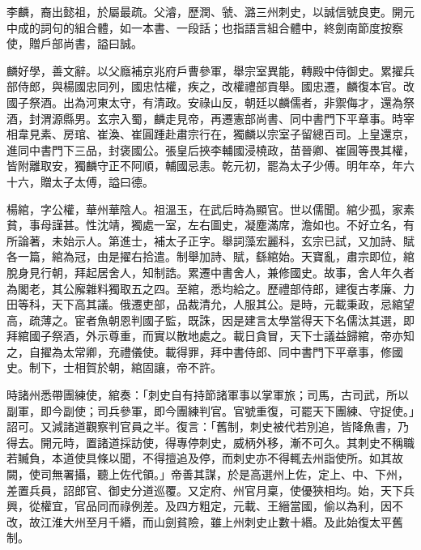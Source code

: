 
\begin{pinyinscope}

 李麟，裔出懿祖，於屬最疏。父濬，歷潤、虢、潞三州刺史，以誠信號良吏。開元中成的詞句的組合體，如一本書、一段話；也指語言組合體中，終劍南節度按察使，贈戶部尚書，謚曰誠。



 麟好學，善文辭。以父廕補京兆府戶曹參軍，舉宗室異能，轉殿中侍御史。累擢兵部侍郎，與楊國忠同列，國忠怙權，疾之，改權禮部貢舉。國忠遷，麟復本官。改國子祭酒。出為河東太守，有清政。安祿山反，朝廷以麟儒者，非禦侮才，還為祭酒，封渭源縣男。玄宗入蜀，麟走見帝，再遷憲部尚書、同中書門下平章事。時宰相韋見素、房琯、崔渙、崔圓踵赴肅宗行在，獨麟以宗室子留總百司。上皇還京，進同中書門下三品，封褒國公。張皇后挾李輔國浸橈政，苗晉卿、崔圓等畏其權，皆附離取安，獨麟守正不阿順，輔國忌恚。乾元初，罷為太子少傅。明年卒，年六十六，贈太子太傅，謚曰德。



 楊綰，字公權，華州華陰人。祖溫玉，在武后時為顯官。世以儒聞。綰少孤，家素貧，事母謹甚。性沈靖，獨處一室，左右圖史，凝塵滿席，澹如也。不好立名，有所論著，未始示人。第進士，補太子正字。舉詞藻宏麗科，玄宗已試，又加詩、賦各一篇，綰為冠，由是擢右拾遣。制舉加詩、賦，繇綰始。天寶亂，肅宗即位，綰脫身見行朝，拜起居舍人，知制誥。累遷中書舍人，兼修國史。故事，舍人年久者為閣老，其公廨雜料獨取五之四。至綰，悉均給之。歷禮部侍郎，建復古孝廉、力田等科，天下高其議。俄遷吏部，品裁清允，人服其公。是時，元載秉政，忌綰望高，疏薄之。宦者魚朝恩判國子監，既誅，因是建言太學當得天下名儒汰其選，即拜綰國子祭酒，外示尊重，而實以散地處之。載日貪冒，天下士議益歸綰，帝亦知之，自擢為太常卿，充禮儀使。載得罪，拜中書侍郎、同中書門下平章事，修國史。制下，士相賀於朝，綰固讓，帝不許。



 時諸州悉帶團練使，綰奏：「刺史自有持節諸軍事以掌軍旅；司馬，古司武，所以副軍，即今副使；司兵參軍，即今團練判官。官號重復，可罷天下團練、守捉使。」詔可。又減諸道觀察判官員之半。復言：「舊制，刺史被代若別追，皆降魚書，乃得去。開元時，置諸道採訪使，得專停刺史，威柄外移，漸不可久。其刺史不稱職若贓負，本道使具條以聞，不得擅追及停，而刺史亦不得輒去州詣使所。如其故闕，使司無署攝，聽上佐代領。」帝善其謀，於是高選州上佐，定上、中、下州，差置兵員，詔郎官、御史分道巡覆。又定府、州官月稟，使優狹相均。始，天下兵興，從權宜，官品同而祿例差。及四方粗定，元載、王縉當國，偷以為利，因不改，故江淮大州至月千緡，而山劍貧險，雖上州刺史止數十緡。及此始復太平舊制。




\end{pinyinscope}
